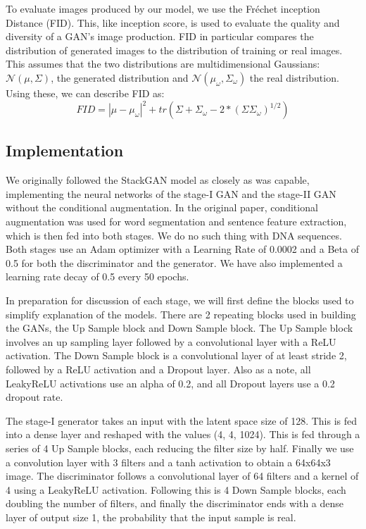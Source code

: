 \documentclass{article}
\begin{document}
	To evaluate images produced by our model, we use the Fréchet inception Distance (FID). This, like inception score, is used to evaluate the quality and diversity of a GAN’s image production. FID in particular compares the distribution of generated images to the distribution of training or real images. This assumes that the two distributions are multidimensional Gaussians: $\mathcal{N}(\mu, \Sigma)$, the generated distribution and $\mathcal{N}(\mu_{\omega}, \Sigma_{\omega})$ the real distribution. Using these, we can describe FID as:
	\begin{equation}
		FID = |\mu-\mu_{\omega}|^{2} + tr(\Sigma + \Sigma_{\omega} - 2*(\Sigma\Sigma_{\omega})^{1/2})
	\end{equation}

	\subsection{Implementation}
	We originally followed the StackGAN model as closely as was capable, implementing the neural networks of the stage-I GAN and the stage-II GAN without the conditional augmentation. In the original paper, conditional augmentation was used for word segmentation and sentence feature extraction, which is then fed into both stages. We do no such thing with DNA sequences. Both stages use an Adam optimizer with a Learning Rate of 0.0002 and a Beta of 0.5 for both the discriminator and the generator. We have also implemented a learning rate decay of 0.5 every 50 epochs.

	In preparation for discussion of each stage, we will first define the blocks used to simplify explanation of the models. There are 2 repeating blocks used in building the GANs, the Up Sample block and Down Sample block. The Up Sample block involves an up sampling layer followed by a convolutional layer with a ReLU activation. The Down Sample block is a convolutional layer of at least stride 2, followed by a ReLU activation and a Dropout layer. Also as a note, all LeakyReLU activations use an alpha of 0.2, and all Dropout layers use a 0.2 dropout rate.

	The stage-I generator takes an input with the latent space size of 128. This is fed into a dense layer and reshaped with the values (4, 4, 1024). This is fed through a series of 4 Up Sample blocks, each reducing the filter size by half. Finally we use a convolution layer with 3 filters and a tanh activation to obtain a 64x64x3 image. The discriminator follows a convolutional layer of 64 filters and a kernel of 4 using a LeakyReLU activation. Following this is 4 Down Sample blocks, each doubling the number of filters, and finally the discriminator ends with a dense layer of output size 1, the probability that the input sample is real.
\end{document}
